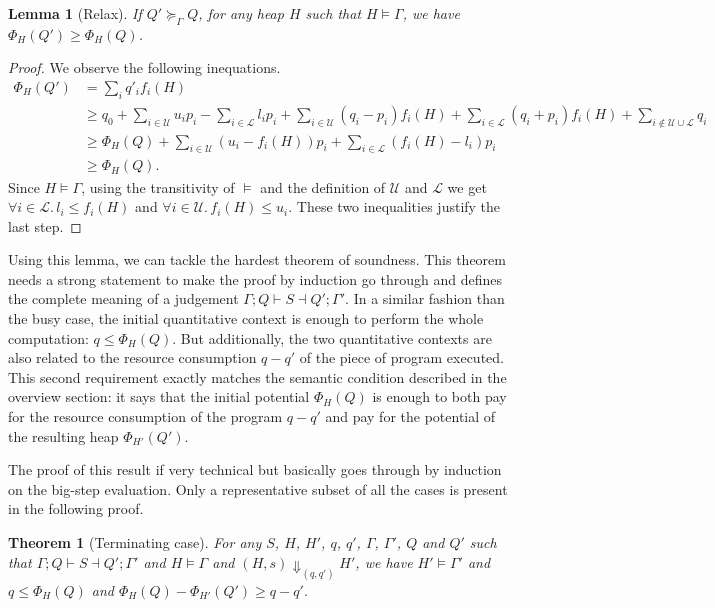 \documentclass[nocopyrightspace,preprint]{sigplanconf}
\newtheorem{lemma}{Lemma}
\newtheorem{theorem}{Theorem}
\begin{document}
\begin{lemma}[Relax]
If $Q' \succeq_\Gamma Q$, for any heap $H$ such that $H \models \Gamma$,
we have $\Phi_H(Q') \ge \Phi_H(Q)$.
\end{lemma}
\begin{proof}
We observe the following inequations.
\begin{align*}
\Phi_H(Q') &= \sum_i q'_i f_i(H) \\
&\ge q_0 + \sum_{i\in\mathcal U} u_i p_i - \sum_{i\in\mathcal L} l_i p_i
  + \sum_{i\in\mathcal U} (q_i - p_i) f_i(H) + \sum_{i\in\mathcal L} (q_i + p_i) f_i(H)
  + \sum_{i\not\in \mathcal U \cup \mathcal L} q_i \\
 &\ge \Phi_H(Q)
  + \sum_{i\in\mathcal U} (u_i - f_i(H)) p_i
  + \sum_{i\in\mathcal L} (f_i(H) - l_i) p_i \\
 &\ge \Phi_H(Q).
\end{align*}
Since $H \models \Gamma$, using the transitivity of $\models$ and
the definition of $\mathcal U$ and $\mathcal L$ we get
$\forall i\in\mathcal L.\, l_i \le f_i(H)$ and
$\forall i\in\mathcal U.\, f_i(H)\le u_i$.
These two inequalities justify the last step.
\end{proof}

Using this lemma, we can tackle the hardest theorem of soundness.  This theorem
needs a strong statement to make the proof by induction go through and defines
the complete meaning of a judgement $\Gamma; Q \vdash S \dashv Q'; \Gamma'$.
In a similar fashion than the busy case, the initial quantitative context is enough
to perform the whole computation: $q \le \Phi_H(Q)$.  But additionally, the
two quantitative contexts are also related to the resource consumption $q - q'$
of the piece of program executed.  This second requirement exactly matches
the semantic condition described in the overview section: it says that the
initial potential $\Phi_H(Q)$ is enough to both pay for the resource
consumption of the program $q - q'$ and pay for the potential of the resulting
heap $\Phi_{H'}(Q')$.

The proof of this result if very technical but basically goes through by induction
on the big-step evaluation.  Only a representative subset of all the cases
is present in the following proof.


\begin{theorem}[Terminating case]
For any $S$, $H$, $H'$, $q$, $q'$, $\Gamma$, $\Gamma'$, $Q$ and $Q'$ such
that $\Gamma; Q \vdash S \dashv Q'; \Gamma'$ and $H \models \Gamma$ and
$(H,s) \Downarrow_{(q,q')} H'$, we have
$H' \models \Gamma'$ and
$q \le \Phi_H(Q)$ and
$\Phi_H(Q) - \Phi_{H'}(Q') \ge q - q'$.
\end{theorem}
\end{document}
